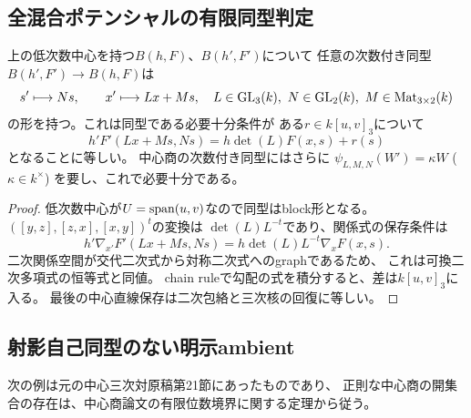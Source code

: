 \subsection{全混合ポテンシャルの有限同型判定}
\begin{proposition}[中心blockと三次ポテンシャルの共変性]
\label{prop:moduli-mixed-block-isomorphism}
上の低次数中心を持つ$B(h,F)$、$B(h',F')$について
任意の次数付き同型$B(h',F')\to B(h,F)$は
\[
 s' \longmapsto Ns,\qquad x'\longmapsto Lx+Ms,
 \quad
 L\in\mathrm{GL}_3(k),\ N\in\mathrm{GL}_2(k),\ M\in\mathrm{Mat}_{3\times2}(k)
\]
の形を持つ。これは同型である必要十分条件が
ある$r\in k[u,v]_3$について
\[
 h'F'(Lx+Ms,Ns)=h\det(L)F(x,s)+r(s)
\]
となることに等しい。
中心商の次数付き同型にはさらに
$\psi_{L,M,N}(W')=\kappa W$ ($\kappa\in k^\times$)
を要し、これで必要十分である。
\end{proposition}
\begin{proof}
低次数中心が$U=\operatorname{span}(u,v)$なので同型はblock形となる。
$([y,z],[z,x],[x,y])^t$の変換は
$\det(L)L^{-t}$であり、関係式の保存条件は
\[
 h'\nabla_{x'}F'(Lx+Ms,Ns)
 =h\det(L)L^{-t}\nabla_xF(x,s).
\]
二次関係空間が交代二次式から対称二次式へのgraphであるため、
これは可換二次多項式の恒等式と同値。
chain ruleで勾配の式を積分すると、差は$k[u,v]_3$に入る。
最後の中心直線保存は二次包絡と三次核の回復に等しい。
\end{proof}

\subsection{射影自己同型のない明示ambient}
次の例は元の中心三次対原稿第21節にあったものであり、
正則な中心商の開集合の存在は、中心商論文の有限位数境界に関する定理から従う。

